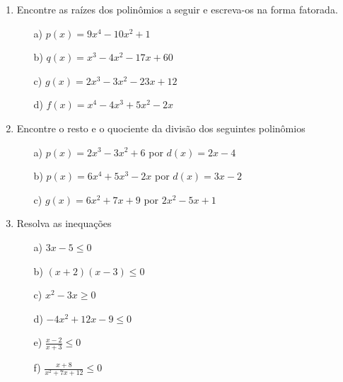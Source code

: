 \begin{enumerate}
\item Encontre as raízes dos polinômios a seguir e escreva-os na forma fatorada.

\begin{minipage}[t]{.44\textwidth}
\begin{itemize}
\item[a)] $ p(x)=9x^4-10x^2+1$
\item[b)] $ q(x)=x^3-4x^2-17x+60$
\end{itemize}
\end{minipage}
\begin{minipage}[t]{.44\textwidth}
\begin{itemize}
\item[c)] $g(x)=2x^3-3x^2-23x+12$
\item[d)] $ f(x)=x^4-4x^3+5x^2-2x$
\end{itemize}
\end{minipage}

\item Encontre o resto e o quociente da divisão dos seguintes polinômios

\begin{minipage}[t]{.44\textwidth}
\begin{itemize}
\item[a)] $ p(x)=2x^3-3x^2+6$ por $d(x)=2x-4$
\item[b)]  $ p(x)=6x^4+5x^3-2x$ por $d(x)=3x-2$
\end{itemize}
\end{minipage}
\begin{minipage}[t]{.44\textwidth}
\begin{itemize}
\item[c)] $g(x)=6x^2+7x+9$ por $2x^2-5x+1$
\end{itemize}
\end{minipage}

\item Resolva as inequações

\begin{minipage}[t]{.44\textwidth}
\begin{itemize}
\item[a)] $ 3x-5 \leq 0$
\item[b)]  $ (x+2)(x-3) \leq 0$
\item[c)] $x^2-3x \geq 0$
\end{itemize}
\end{minipage}
\begin{minipage}[t]{.44\textwidth}
\begin{itemize}
\item[d)] $-4x^2+12x-9 \leq 0$
\item[e)]$ \frac{x-2}{x+3} \leq 0$
\item[f)] $\frac{x+8}{x^2+7x+12} \leq 0$
\end{itemize}
\end{minipage}
\end{enumerate}
